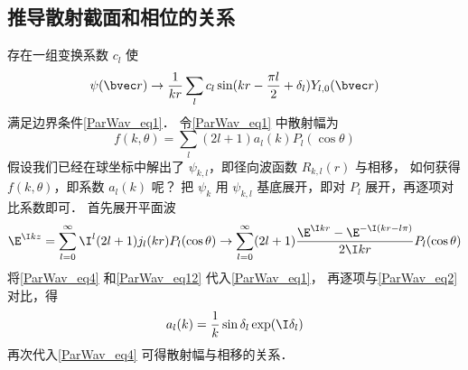 \subsection{推导散射截面和相位的关系}
存在一组变换系数 $c_l$ 使
\begin{equation}\label{ParWav_eq2}
\psi(\bvec r) \rightarrow \frac{1}{kr} \sum_l c_l \sin(kr - \frac{\pi l}{2} + \delta_l) Y_{l,0}(\bvec r)
\end{equation}
满足边界条件\autoref{ParWav_eq1}． 令\autoref{ParWav_eq1} 中散射幅为
\begin{equation}\label{ParWav_eq4}
f(k,\theta) = \sum_l (2l + 1) a_l(k) P_l(\cos \theta)
\end{equation}
假设我们已经在球坐标中解出了 $\psi_{k,l}$，即径向波函数 $R_{k,l}(r)$ 与相移， 如何获得 $f(k,\theta )$，即系数 $a_l(k)$ 呢？ 把 $\psi_k$ 用 $\psi_{k,l}$ 基底展开，即对 $P_l$ 展开，再逐项对比系数即可． 首先展开平面波
\begin{equation}\label{ParWav_eq12}
\E^{\I kz} = \sum_{l = 0}^\infty  \I^l (2l + 1) j_l(kr) P_l(\cos \theta) \rightarrow \sum_{l=0}^\infty  (2l + 1)\frac{\E^{\I kr} - \E^{-\I(kr - l\pi)}}{2\I kr} P_l(\cos \theta)
\end{equation}
将\autoref{ParWav_eq4} 和\autoref{ParWav_eq12} 代入\autoref{ParWav_eq1}， 再逐项与\autoref{ParWav_eq2} 对比，得
\begin{equation}
a_l(k) = \frac{1}{k} \sin\delta_l \exp(\I \delta_l)
\end{equation}
再次代入\autoref{ParWav_eq4} 可得散射幅与相移的关系．
